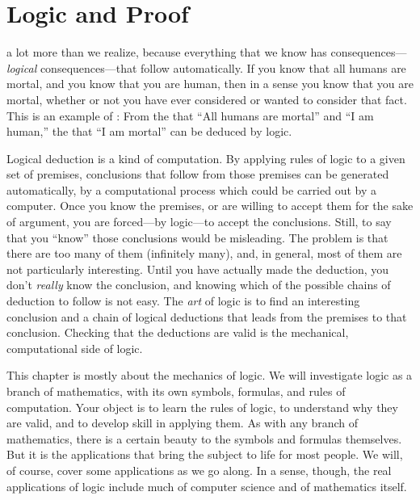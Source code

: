 \chapter{Logic and Proof}\label{C-logic}\label{C-proof}


a lot more than we realize,
because everything that we know has consequences---\emph{logical} 
consequences---that follow automatically.  If you know that all
humans are mortal, and you know that you are human, then in a
sense you know that you are mortal, whether or not you have ever
considered or wanted to consider that fact.  This is an example
of : From the  that ``All
humans are mortal'' and ``I am human,'' the 
that ``I am mortal'' can be deduced by logic.

Logical deduction is a kind of computation.  By applying rules
of logic to a given set of premises, conclusions that follow
from those premises can be generated automatically, by a
computational process which could be carried out by a computer.
Once you know the premises, or are willing to accept them for
the sake of argument, you are forced---by logic---to accept
the conclusions.  Still, to say that you ``know'' those conclusions
would be misleading.  The problem is that there are too many of
them (infinitely many), and, in general, most of them are not
particularly interesting.  Until you have actually made the 
deduction, you don't \emph{really} know the conclusion, and 
knowing which of the possible chains of deduction to follow
is not easy.  The \emph{art} of logic is to find
an interesting conclusion and a chain of logical deductions that
leads from the premises to that conclusion.  Checking that the
deductions are valid is the mechanical, computational side of
logic.

This chapter is mostly about the mechanics of logic.  We will 
investigate logic as a branch of mathematics, with its own
symbols, formulas, and rules of computation.  Your object is
to learn the rules of logic, to understand why they are valid,
and to develop skill in applying them.  As with any branch of
mathematics, there is a certain beauty to the symbols and formulas
themselves.  But it is the applications that bring the subject to
life for most people.  We will, of course, cover some applications
as we go along.   In a sense, though, the real applications of
logic include much of computer science and of mathematics itself.

